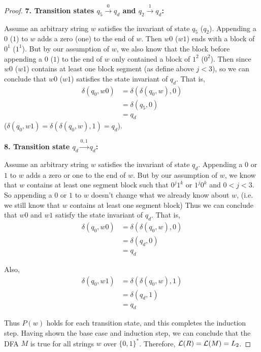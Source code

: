 \begin{proof}
\newpage
        
        \textbf{7. Transition states $q_5 \xrightarrow{0} q_d$ and $q_2 \xrightarrow{1} q_d$:}
        
        Assume an arbitrary string $w$ satisfies the invariant of state $q_5$ ($q_2$). 
        Appending a $0$ ($1$) to $w$ adds a zero (one) to the end of $w$. Then
        $w0$ ($w1$) ends with a block of $0^1$ ($1^1$). But by our assumption of $w$, 
        we also
        know that the block before appending a $0$ ($1$) to the end of $w$ only 
        contained a block of $1^2$ ($0^2$). Then since $w0$ ($w1$) contains at least
        one block segment (as define above $j < 3$), so we can conclude that 
        $w0$ ($w1$) satisfies the state invariant of $q_d$. That is,
        \begin{align*}
            \delta(q_0, w0) &= \delta(\delta(q_0, w), 0) \\
            &= \delta(q_5, 0) \tag{by assumption} \\
            &= q_d
        \end{align*}
        ($\delta(q_0, w1) = \delta(\delta(q_0, w), 1) = q_d$).
        
        \vspace{5mm}
        
        \textbf{8. Transition state $q_d \xrightarrow{0, 1} q_d$:}
        
        Assume an arbitrary string $w$ satisfies the invariant of state $q_d$. 
        Appending a $0$ or $1$ to $w$ adds a zero or one to the end of $w$. But
        by our assumption of $w$, we know that $w$ contains at least one segment block
        such that $0^j1^k$ or $1^j0^k$ and $0 < j < 3$. So appending a $0$ or $1$
        to $w$ doesn't change what we already know about $w$, 
        (i.e. we still know that $w$ contains at least one segment block)
        Thus we can conclude that $w0$ and $w1$ satisfy the state invariant 
        of $q_d$. That is,
        \begin{align*}
            \delta(q_0, w0) &= \delta(\delta(q_0, w), 0) \\
            &= \delta(q_d, 0) \tag{by assumption} \\
            &= q_d
        \end{align*}
        
        Also,
        \begin{align*}
            \delta(q_0, w1) &= \delta(\delta(q_0, w), 1) \\
            &= \delta(q_d, 1) \tag{by assumption} \\
            &= q_d
        \end{align*}
        
        Thus $P(w)$ holds for each transition state, and this completes the
        induction step. Having shown the base case and induction step, we 
        can conclude that the DFA $M$ is true for all strings $w$ over 
        $\{ 0, 1 \}^*$. Therefore, $\mathcal{L}(R) = \mathcal{L}(M) = L_2$.
    \end{proof}
	
